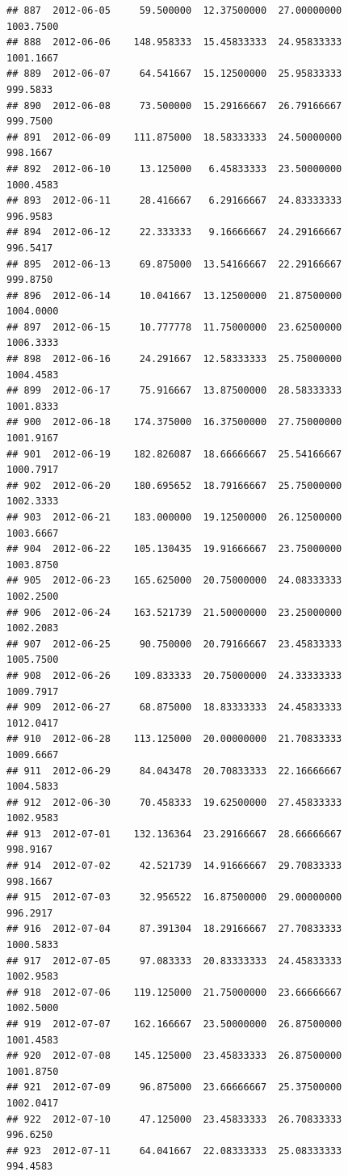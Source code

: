 \documentclass[
]{article}
\begin{document}
\begin{verbatim}
## 887  2012-06-05     59.500000  12.37500000  27.00000000    1003.7500
## 888  2012-06-06    148.958333  15.45833333  24.95833333    1001.1667
## 889  2012-06-07     64.541667  15.12500000  25.95833333     999.5833
## 890  2012-06-08     73.500000  15.29166667  26.79166667     999.7500
## 891  2012-06-09    111.875000  18.58333333  24.50000000     998.1667
## 892  2012-06-10     13.125000   6.45833333  23.50000000    1000.4583
## 893  2012-06-11     28.416667   6.29166667  24.83333333     996.9583
## 894  2012-06-12     22.333333   9.16666667  24.29166667     996.5417
## 895  2012-06-13     69.875000  13.54166667  22.29166667     999.8750
## 896  2012-06-14     10.041667  13.12500000  21.87500000    1004.0000
## 897  2012-06-15     10.777778  11.75000000  23.62500000    1006.3333
## 898  2012-06-16     24.291667  12.58333333  25.75000000    1004.4583
## 899  2012-06-17     75.916667  13.87500000  28.58333333    1001.8333
## 900  2012-06-18    174.375000  16.37500000  27.75000000    1001.9167
## 901  2012-06-19    182.826087  18.66666667  25.54166667    1000.7917
## 902  2012-06-20    180.695652  18.79166667  25.75000000    1002.3333
## 903  2012-06-21    183.000000  19.12500000  26.12500000    1003.6667
## 904  2012-06-22    105.130435  19.91666667  23.75000000    1003.8750
## 905  2012-06-23    165.625000  20.75000000  24.08333333    1002.2500
## 906  2012-06-24    163.521739  21.50000000  23.25000000    1002.2083
## 907  2012-06-25     90.750000  20.79166667  23.45833333    1005.7500
## 908  2012-06-26    109.833333  20.75000000  24.33333333    1009.7917
## 909  2012-06-27     68.875000  18.83333333  24.45833333    1012.0417
## 910  2012-06-28    113.125000  20.00000000  21.70833333    1009.6667
## 911  2012-06-29     84.043478  20.70833333  22.16666667    1004.5833
## 912  2012-06-30     70.458333  19.62500000  27.45833333    1002.9583
## 913  2012-07-01    132.136364  23.29166667  28.66666667     998.9167
## 914  2012-07-02     42.521739  14.91666667  29.70833333     998.1667
## 915  2012-07-03     32.956522  16.87500000  29.00000000     996.2917
## 916  2012-07-04     87.391304  18.29166667  27.70833333    1000.5833
## 917  2012-07-05     97.083333  20.83333333  24.45833333    1002.9583
## 918  2012-07-06    119.125000  21.75000000  23.66666667    1002.5000
## 919  2012-07-07    162.166667  23.50000000  26.87500000    1001.4583
## 920  2012-07-08    145.125000  23.45833333  26.87500000    1001.8750
## 921  2012-07-09     96.875000  23.66666667  25.37500000    1002.0417
## 922  2012-07-10     47.125000  23.45833333  26.70833333     996.6250
## 923  2012-07-11     64.041667  22.08333333  25.08333333     994.4583

\end{verbatim}
\end{document}
